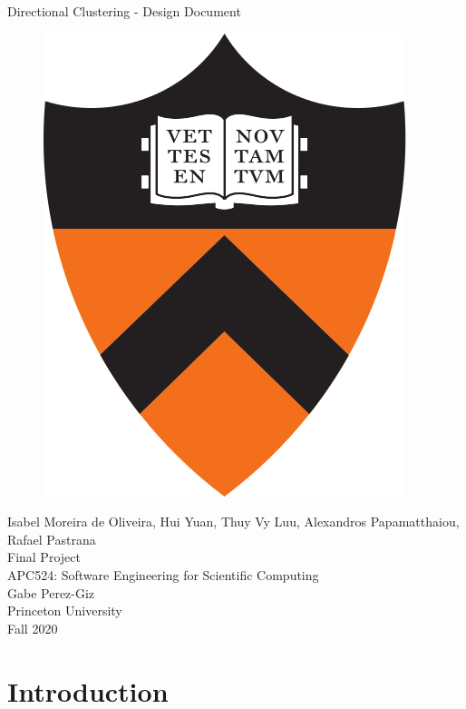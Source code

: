 \documentclass[11pt]{article}
\title{}
\author{}
\date{} %
\begin{document}
\begin{titlepage}
\centering
\vspace*{0mm}
\Large{Directional Clustering -  Design Document}
\vspace{30mm}

\begin{figure}[H]
\centering
\includegraphics[scale=0.2]{pton (1).png}
\end{figure}
\vspace{30mm}
\Large{Isabel Moreira de Oliveira, Hui Yuan, Thuy Vy Luu, Alexandros Papamatthaiou, Rafael Pastrana}\\

\vspace{8mm}
\large{Final Project  \\ APC524: Software Engineering for Scientific Computing \\ }
\large{Gabe Perez-Giz}\\
\large{Princeton University \\Fall 2020\\}

\end{titlepage}


\section{Introduction}
\end{document}
